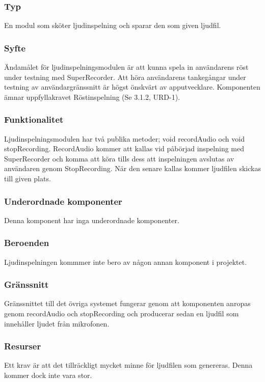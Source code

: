 \subsubsection{Typ}
En modul som sköter ljudinspelning och sparar den som given ljudfil.

\subsubsection{Syfte}
Ändamålet för ljudinspelningsmodulen är att kunna spela in användarens röst under testning med SuperRecorder. Att höra användarens tankegångar under testning av användargränssnitt är högst önskvärt av apputvecklare. Komponenten ämnar uppfyllakravet Röstinspelning (Se 3.1.2, URD-1).

\subsubsection{Funktionalitet}
Ljudinspelningsmodulen har två publika metoder; void recordAudio och void stopRecording. RecordAudio kommer att kallas vid påbörjad inspelning med SuperRecorder och komma att köra tills dess att inspelningen avslutas av användaren genom StopRecording. När den senare kallas kommer ljudfilen skickas till given plats.

\subsubsection{Underordnade komponenter}
Denna komponent har inga underordnade komponenter.

\subsubsection{Beroenden}
Ljudinspelningen kommmer inte bero av någon annan komponent i projektet.

\subsubsection{Gränssnitt}
Gränssnittet till det övriga systemet fungerar genom att komponenten anropas genom recordAudio och stopRecording och producerar sedan en ljudfil som innehåller ljudet från mikrofonen.

\subsubsection{Resurser}
Ett krav är att det tillräckligt mycket minne för ljudfilen som genereras. Denna kommer dock inte vara stor.

